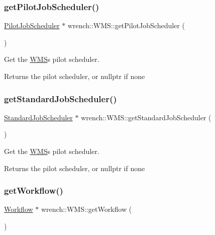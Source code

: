 \subsubsection{\texorpdfstring{get\+Pilot\+Job\+Scheduler()}{getPilotJobScheduler()}}
{\footnotesize\ttfamily \hyperlink{classwrench_1_1_pilot_job_scheduler}{Pilot\+Job\+Scheduler} $\ast$ wrench\+::\+W\+M\+S\+::get\+Pilot\+Job\+Scheduler (\begin{DoxyParamCaption}{ }\end{DoxyParamCaption})}



Get the \hyperlink{classwrench_1_1_w_m_s}{W\+MS}\textquotesingle{}s pilot scheduler. 

\begin{DoxyReturn}{Returns}
the pilot scheduler, or nullptr if none 
\end{DoxyReturn}
\mbox{\label{classwrench_1_1_w_m_s_ae350b1268c2122d5094852d3b6241e7a}} 
\subsubsection{\texorpdfstring{get\+Standard\+Job\+Scheduler()}{getStandardJobScheduler()}}
{\footnotesize\ttfamily \hyperlink{classwrench_1_1_standard_job_scheduler}{Standard\+Job\+Scheduler} $\ast$ wrench\+::\+W\+M\+S\+::get\+Standard\+Job\+Scheduler (\begin{DoxyParamCaption}{ }\end{DoxyParamCaption})}



Get the \hyperlink{classwrench_1_1_w_m_s}{W\+MS}\textquotesingle{}s pilot scheduler. 

\begin{DoxyReturn}{Returns}
the pilot scheduler, or nullptr if none 
\end{DoxyReturn}
\mbox{\label{classwrench_1_1_w_m_s_a44b586fe5f584755375691a12d815aa3}} 
\subsubsection{\texorpdfstring{get\+Workflow()}{getWorkflow()}}
{\footnotesize\ttfamily \hyperlink{classwrench_1_1_workflow}{Workflow} $\ast$ wrench\+::\+W\+M\+S\+::get\+Workflow (\begin{DoxyParamCaption}{ }\end{DoxyParamCaption})}



